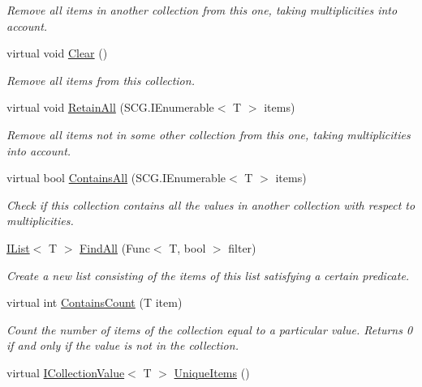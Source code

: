 \begin{DoxyCompactItemize}
\begin{DoxyCompactList}\small\item\em Remove all items in another collection from this one, taking multiplicities into account. \end{DoxyCompactList}\item 
virtual void \hyperlink{class_c5_1_1_hashed_linked_list_a3d890e2da8746df9cf82d3ccaf561d44}{Clear} ()
\begin{DoxyCompactList}\small\item\em Remove all items from this collection. \end{DoxyCompactList}\item 
virtual void \hyperlink{class_c5_1_1_hashed_linked_list_a56ae0d7eee62da4832bfc2363adf056e}{Retain\+All} (S\+C\+G.\+I\+Enumerable$<$ T $>$ items)
\begin{DoxyCompactList}\small\item\em Remove all items not in some other collection from this one, taking multiplicities into account. \end{DoxyCompactList}\item 
virtual bool \hyperlink{class_c5_1_1_hashed_linked_list_a8592fd2f2b3cea5329acaf4331dff7bc}{Contains\+All} (S\+C\+G.\+I\+Enumerable$<$ T $>$ items)
\begin{DoxyCompactList}\small\item\em Check if this collection contains all the values in another collection with respect to multiplicities. \end{DoxyCompactList}\item 
\hyperlink{interface_c5_1_1_i_list}{I\+List}$<$ T $>$ \hyperlink{class_c5_1_1_hashed_linked_list_a4a12ba4a72a0d544589a4aabba1c63de}{Find\+All} (Func$<$ T, bool $>$ filter)
\begin{DoxyCompactList}\small\item\em Create a new list consisting of the items of this list satisfying a certain predicate. \end{DoxyCompactList}\item 
virtual int \hyperlink{class_c5_1_1_hashed_linked_list_a0bf0f2c26ac2975f17d240880ca79de5}{Contains\+Count} (T item)
\begin{DoxyCompactList}\small\item\em Count the number of items of the collection equal to a particular value. Returns 0 if and only if the value is not in the collection. \end{DoxyCompactList}\item 
virtual \hyperlink{interface_c5_1_1_i_collection_value}{I\+Collection\+Value}$<$ T $>$ \hyperlink{class_c5_1_1_hashed_linked_list_a11f80f9fc36538f944da608ce8ae8e6e}{Unique\+Items} ()

\end{DoxyCompactItemize}
